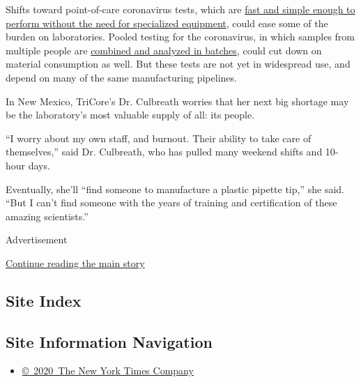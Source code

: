 Shifts toward point-of-care coronavirus tests, which are
\href{https://www.nytimes3xbfgragh.onion/2020/07/06/health/fast-coronavirus-tests.html}{fast
and simple enough to perform without the need for specialized
equipment}, could ease some of the burden on laboratories. Pooled
testing for the coronavirus, in which samples from multiple people are
\href{https://www.nytimes3xbfgragh.onion/2020/07/01/health/coronavirus-pooled-testing.html}{combined
and analyzed in batches}, could cut down on material consumption as
well. But these tests are not yet in widespread use, and depend on many
of the same manufacturing pipelines.

In New Mexico, TriCore's Dr. Culbreath worries that her next big
shortage may be the laboratory's most valuable supply of all: its
people.

``I worry about my own staff, and burnout. Their ability to take care of
themselves,'' said Dr. Culbreath, who has pulled many weekend shifts and
10-hour days.

Eventually, she'll ``find someone to manufacture a plastic pipette
tip,'' she said. ``But I can't find someone with the years of training
and certification of these amazing scientists.''

Advertisement

\protect\hyperlink{after-bottom}{Continue reading the main story}

\hypertarget{site-index}{%
\subsection{Site Index}\label{site-index}}

\hypertarget{site-information-navigation}{%
\subsection{Site Information
Navigation}\label{site-information-navigation}}

\begin{itemize}
\tightlist
\item
  \href{https://help.nytimes3xbfgragh.onion/hc/en-us/articles/115014792127-Copyright-notice}{©~2020~The
  New York Times Company}
\end{itemize}

